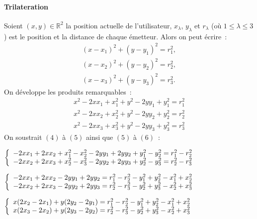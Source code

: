 \documentclass[11pt,a4paper]{article}
\begin{document}
    \paragraph{Trilateration}
      Soient $(x, y) \in \mathbb R^2$ la position actuelle de l'utilisateur, $x_{\lambda}$, $y_{\lambda}$ et $r_{\lambda}$ (où $1 \leq \lambda \leq 3$) est le position et la distance de chaque
	  émetteur. Alors on peut écrire~:
      \begin{align}
        (x-x_{1})^{2}+(y-y_{1})^{2} = r_{1}^{2}, \\
        (x-x_{2})^{2}+(y-y_{2})^{2} = r_{2}^{2}, \\
        (x-x_{3})^{2}+(y-y_{3})^{2} = r_{3}^{2}.
      \end{align}
      On développe les produits remarquables~:
      \begin{align}
        x^{2}-2xx_{1}+x_{1}^{2}+y^{2}-2yy_{1}+y_{1}^{2} = r_{1}^{2} \\
        x^{2}-2xx_{2}+x_{2}^{2}+y^{2}-2yy_{2}+y_{2}^{2} = r_{2}^{2} \\
        x^{2}-2xx_{3}+x_{3}^{2}+y^{2}-2yy_{3}+y_{3}^{2} = r_{3}^{2}
      \end{align}
      On soustrait $(4)$ à $(5)$ ainsi que $(5)$ à $(6)$~:
      \begin{center}
        $\left \{
        \begin{array}{c c}
          -2xx_{1}+2xx_{2}+x_{1}^{2}-x_{2}^{2}-2yy_{1}+2yy_{2}+y_{1}^{2}-y_{2}^{2} = r_{1}^{2}-r_{2}^{2} \\
          -2xx_{2}+2xx_{3}+x_{2}^{2}-x_{3}^{2}-2yy_{2}+2yy_{3}+y_{2}^{2}-y_{3}^{2} = r_{2}^{2}-r_{3}^{2}
        \end{array}
        \right.$
      \end{center}
      \begin{center}
        $\left \{
        \begin{array}{c c}
          -2xx_{1}+2xx_{2}-2yy_{1}+2yy_{2} = r_{1}^{2}-r_{2}^{2}-y_{1}^{2}+y_{2}^{2}-x_{1}^{2}+x_{2}^{2} \\
          -2xx_{2}+2xx_{3}-2yy_{2}+2yy_{3} = r_{2}^{2}-r_{3}^{2}-y_{2}^{2}+y_{3}^{2}-x_{2}^{2}+x_{3}^{2}
        \end{array}
        \right.$
      \end{center}
      \begin{center}
        $\left \{
        \begin{array}{c c}
          x(2x_{2}-2x_{1})+y(2y_{2}-2y_{1}) = r_{1}^{2}-r_{2}^{2}-y_{1}^{2}+y_{2}^{2}-x_{1}^{2}+x_{2}^{2} \\
          x(2x_{3}-2x_{2})+y(2y_{3}-2y_{2}) = r_{2}^{2}-r_{3}^{2}-y_{2}^{2}+y_{3}^{2}-x_{2}^{2}+x_{3}^{2}
        \end{array}
        \right.$
      \end{center}
\end{document}
